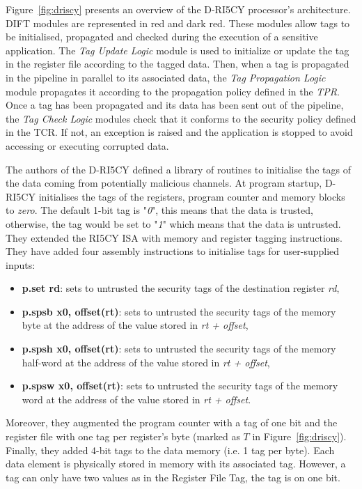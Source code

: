 Figure~\ref{fig:driscy} presents an overview of the D-RI5CY processor's architecture. DIFT modules are represented in red and dark red.
These modules allow tags to be initialised, propagated and checked during the execution of a sensitive application.
The \textit{Tag Update Logic} module is used to initialize or update the tag in the register file according to the tagged data.
Then, when a tag is propagated in the pipeline in parallel to its associated data, the \textit{Tag Propagation Logic} module propagates it according to the propagation policy defined in the \textit{TPR}.
Once a tag has been propagated and its data has been sent out of the pipeline, the \textit{Tag Check Logic} modules check that it conforms to the security policy defined in the TCR. If not, an exception is raised and the application is stopped to avoid accessing or executing corrupted data.

The authors of the D-RI5CY defined a library of routines to initialise the tags of the data coming from potentially malicious channels.
At program startup, D-RI5CY initialises the tags of the registers, program counter and memory blocks to \textit{zero}. The default 1-bit tag is "\textit{0}", this means that the data is trusted, otherwise, the tag would be set to "\textit{1}" which means that the data is untrusted.
They extended the RI5CY ISA with memory and register tagging instructions.
They have added four assembly instructions to initialise tags for user-supplied inputs:
\begin{itemize}
    \item \textbf{p.set rd}: sets to untrusted the security tags of the destination register \textit{rd},%
    \item \textbf{p.spsb x0, offset(rt)}: sets to untrusted the security tags of the memory byte at the address of the value stored in \textit{rt + offset},
    \item \textbf{p.spsh x0, offset(rt)}: sets to untrusted the security tags of the memory half-word at the address of the value stored in \textit{rt + offset},
    \item \textbf{p.spsw x0, offset(rt)}: sets to untrusted the security tags of the memory word at the address of the value stored in \textit{rt + offset}.
\end{itemize}


Moreover, they augmented the program counter with a tag of one bit and the register file with one tag per register's byte (marked as $T$ in Figure~\ref{fig:driscy}). Finally, they added 4-bit tags to the data memory (i.e. 1 tag per byte).
Each data element is physically stored in memory with its associated tag. However, a tag can only have two values as in the Register File Tag, the tag is on one bit.

